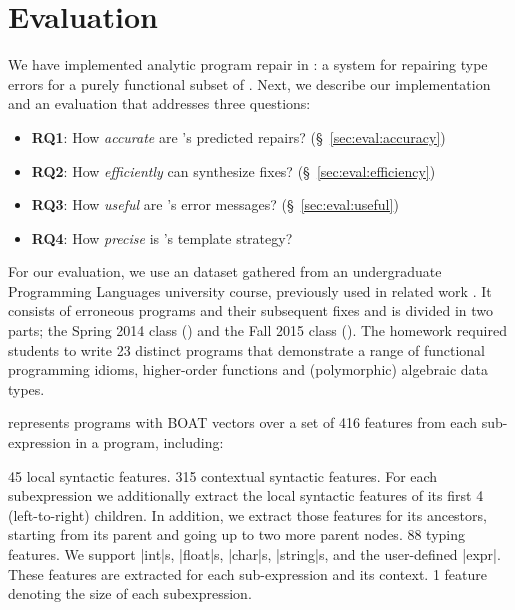 \section{Evaluation}
\label{sec:eval}

\lstMakeShortInline[mathescape=true]{|}

We have implemented analytic program repair in \toolname: a system for 
repairing type errors for a purely functional subset of \ocaml. Next,
we describe our implementation and an evaluation that addresses three 
questions:

\begin{itemize}
    \item \textbf{RQ1}: How \emph{accurate} are \toolname's predicted repairs? 
                        (\S~\ref{sec:eval:accuracy}) 
    \item \textbf{RQ2}: How \emph{efficiently} can \toolname synthesize fixes?
                        (\S~\ref{sec:eval:efficiency}) 
    \item \textbf{RQ3}: How \emph{useful} are \toolname's error messages? 
                        (\S~\ref{sec:eval:useful}) 
    \item \textbf{RQ4}: How \emph{precise} is \toolname's template strategy?

\end{itemize}


%
For our evaluation, we use an \ocaml dataset gathered from an undergraduate
Programming Languages university course, previously used in related work
\citep{yunounderstand,Seidel:2017}. It consists of erroneous programs and their
subsequent fixes and is divided in two parts; the Spring 2014 class (\SPRING)
and the Fall 2015 class (\FALL). The homework required students to write 23
distinct programs that demonstrate a range of functional programming idioms, \eg
higher-order functions and (polymorphic) algebraic data types.

%
\toolname represents programs with BOAT vectors over 
a set of 416 features from each sub-expression in a 
program, including: 

45 local syntactic features.
%
315 contextual syntactic features. For each subexpression we
additionally extract the local syntactic features of its first 4
(left-to-right) children. In addition, we extract those features for its
ancestors, starting from its parent and going up to two more parent nodes.
88 typing features. We support |int|s, |float|s, |char|s, |string|s, and
    the user-defined |expr|. These features are extracted for each
    sub-expression and its context.
% 
1 feature denoting the size of each subexpression.


